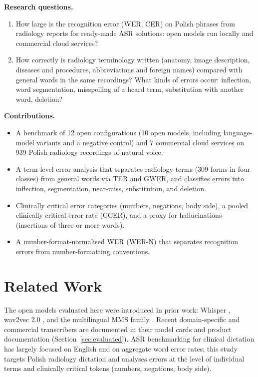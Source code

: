 \documentclass[conference]{IEEEtran}
\begin{document}
\noindent\textbf{Research questions.}
\begin{enumerate}
\item How large is the recognition error (WER, CER) on Polish phrases from radiology reports for ready-made ASR solutions: open models run locally and commercial cloud services?
\item How correctly is radiology terminology written (anatomy, image description, diseases and procedures, abbreviations and foreign names) compared with general words in the same recordings? What kinds of errors occur: inflection, word segmentation, misspelling of a heard term, substitution with another word, deletion?
\end{enumerate}

\noindent\textbf{Contributions.}
\begin{itemize}
\item A benchmark of 12 open configurations (10 open models, including language-model variants and a negative control) and 7 commercial cloud services on 939 Polish radiology recordings of natural voice.
\item A term-level error analysis that separates radiology terms (309 forms in four classes) from general words via TER and GWER, and classifies errors into inflection, segmentation, near-miss, substitution, and deletion.
\item Clinically critical error categories (numbers, negations, body side), a pooled clinically critical error rate (CCER), and a proxy for hallucinations (insertions of three or more words).
\item A number-format-normalised WER (WER-N) that separates recognition errors from number-formatting conventions.
\end{itemize}

\section{Related Work}
The open models evaluated here were introduced in prior work: Whisper \cite{r2}, wav2vec 2.0 \cite{r3}, and the multilingual MMS family \cite{r4}. Recent domain-specific and commercial transcribers are documented in their model cards and product documentation (Section~\ref{sec:evaluated}). ASR benchmarking for clinical dictation has largely focused on English and on aggregate word error rates; this study targets Polish radiology dictation and analyses errors at the level of individual terms and clinically critical tokens (numbers, negations, body side).
\end{document}
